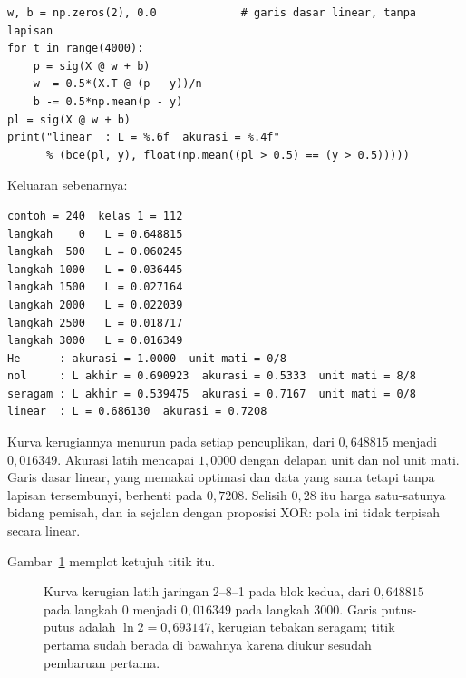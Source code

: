 \begin{lab}
\begin{verbatim}
w, b = np.zeros(2), 0.0             # garis dasar linear, tanpa lapisan
for t in range(4000):
    p = sig(X @ w + b)
    w -= 0.5*(X.T @ (p - y))/n
    b -= 0.5*np.mean(p - y)
pl = sig(X @ w + b)
print("linear  : L = %.6f  akurasi = %.4f"
      % (bce(pl, y), float(np.mean((pl > 0.5) == (y > 0.5)))))
\end{verbatim}
Keluaran sebenarnya:
\begin{verbatim}
contoh = 240  kelas 1 = 112
langkah    0   L = 0.648815
langkah  500   L = 0.060245
langkah 1000   L = 0.036445
langkah 1500   L = 0.027164
langkah 2000   L = 0.022039
langkah 2500   L = 0.018717
langkah 3000   L = 0.016349
He      : akurasi = 1.0000  unit mati = 0/8
nol     : L akhir = 0.690923  akurasi = 0.5333  unit mati = 8/8
seragam : L akhir = 0.539475  akurasi = 0.7167  unit mati = 0/8
linear  : L = 0.686130  akurasi = 0.7208
\end{verbatim}
\end{lab}

Kurva kerugiannya menurun pada setiap pencuplikan, dari $0{,}648815$ menjadi $0{,}016349$. Akurasi latih mencapai $1{,}0000$ dengan delapan unit dan nol unit mati. Garis dasar linear, yang
memakai optimasi dan data yang sama tetapi tanpa lapisan tersembunyi, berhenti pada
$0{,}7208$. Selisih $0{,}28$ itu harga satu-satunya bidang pemisah, dan ia sejalan dengan proposisi XOR: pola ini tidak terpisah secara linear.

Gambar~\ref{fig:kurva-kerugian} memplot ketujuh titik itu.

\begin{figure}[htbp]
\centering
{}
\caption{Kurva kerugian latih jaringan 2--8--1 pada blok kedua, dari $0{,}648815$ pada
langkah $0$ menjadi $0{,}016349$ pada langkah $3000$. Garis putus-putus adalah
$\ln 2=0{,}693147$, kerugian tebakan seragam; titik pertama sudah berada di bawahnya
karena diukur sesudah pembaruan pertama.}
\label{fig:kurva-kerugian}
\end{figure}


